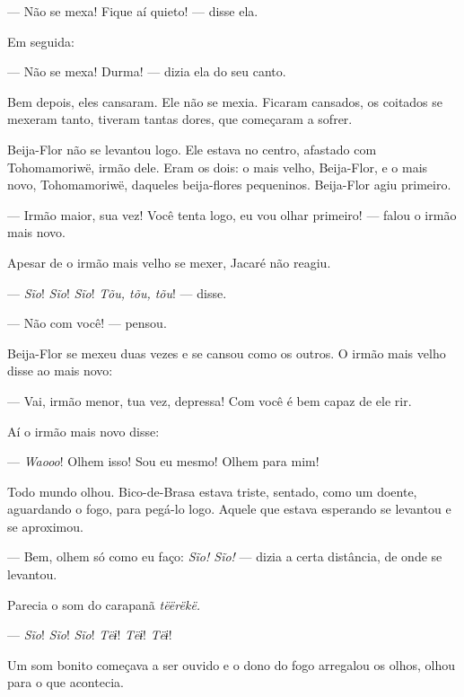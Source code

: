 --- Não se mexa! Fique aí quieto! --- disse ela.

Em seguida:

--- Não se mexa! Durma! --- dizia ela do seu canto.


Bem depois, eles cansaram. Ele não se mexia. Ficaram cansados, os
coitados se mexeram tanto, tiveram tantas dores, que começaram a
sofrer. 

Beija-Flor não se levantou logo. Ele estava no centro, afastado com
Tohomamoriwë, irmão dele. Eram os dois: o mais velho, Beija-Flor, e o
mais novo, Tohomamoriwë, daqueles beija-flores pequeninos. Beija-Flor
agiu primeiro. 

--- Irmão maior, sua vez! Você tenta logo, eu vou olhar primeiro! ---
falou o irmão mais novo. 

Apesar de o irmão mais velho se mexer, Jacaré não reagiu.

--- \textit{Sĩo}! \textit{Sĩo}! \textit{Sĩo}! \textit{Tõu, tõu, tõu}! --- disse.


--- Não com você! --- pensou. 

Beija-Flor se mexeu duas vezes e se cansou como os outros.
O irmão mais velho disse ao mais novo: 

--- Vai, irmão menor, tua vez, depressa! Com você é bem capaz de ele
rir.

Aí o irmão mais novo disse:

--- \textit{Waooo}! Olhem isso! Sou eu mesmo! Olhem para mim! 

Todo mundo olhou. Bico-de-Brasa estava triste, sentado, como um
doente, aguardando o fogo, para pegá-lo logo. Aquele que estava esperando
se levantou e se aproximou. 

--- Bem, olhem só como eu faço: \textit{Sĩo! Sĩo!} --- dizia a certa
distância, de onde se levantou. 

Parecia o som do carapanã \textit{tëërëkë.}

--- \textit{Sĩo}! \textit{Sĩo}! \textit{Sĩo}! \textit{Tëɨ}! \textit{Tëɨ}! \textit{Tëɨ}!

Um som bonito começava a ser ouvido e o dono do fogo arregalou os olhos,
olhou para o que acontecia.

